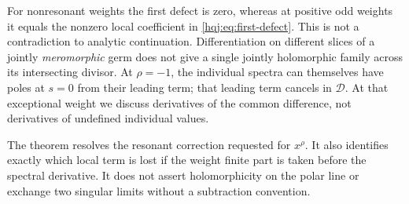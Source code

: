 \begin{remark}
For nonresonant weights the first defect is zero, whereas at positive
odd weights it equals the nonzero local coefficient in
\eqref{hqj:eq:first-defect}. This is not a contradiction to analytic
continuation. Differentiation on different slices of a jointly
\emph{meromorphic} germ does not give a single jointly holomorphic
family across its intersecting divisor. At $\rho=-1$, the individual
spectra can themselves have poles at $s=0$ from their leading term;
that leading term cancels in $\mathcal D$. At that exceptional weight
we discuss derivatives of the common difference, not derivatives of
undefined individual values.
\end{remark}

The theorem resolves the resonant correction requested for $x^\rho$.
It also identifies exactly which local term is lost if the weight finite
part is taken before the spectral derivative. It does not assert
holomorphicity on the polar line or exchange two singular limits
without a subtraction convention.
